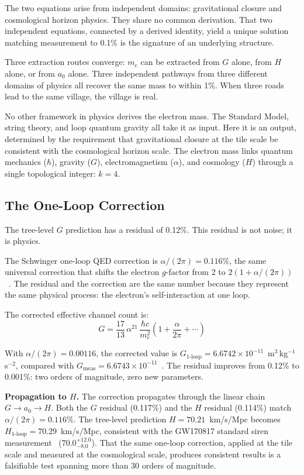 \documentclass[aps,prd,preprint,superscriptaddress,showpacs,preprintnumbers,amsmath,amssymb,nofootinbib]{revtex4-2}
\begin{document}
The two equations arise from independent domains: gravitational closure and cosmological horizon physics. They share no common derivation. That two independent equations, connected by a derived identity, yield a unique solution matching measurement to 0.1\% is the signature of an underlying structure.

Three extraction routes converge: $m_e$ can be extracted from $G$ alone, from $H$ alone, or from $a_0$ alone. Three independent pathways from three different domains of physics all recover the same mass to within 1\%. When three roads lead to the same village, the village is real.

No other framework in physics derives the electron mass. The Standard Model, string theory, and loop quantum gravity all take it as input. Here it is an output, determined by the requirement that gravitational closure at the tile scale be consistent with the cosmological horizon scale. The electron mass links quantum mechanics ($\hbar$), gravity ($G$), electromagnetism ($\alpha$), and cosmology ($H$) through a single topological integer: $k = 4$.

\subsection{The One-Loop Correction}
\label{subsec:one-loop}

The tree-level $G$ prediction has a residual of 0.12\%. This residual is not noise; it is physics.

The Schwinger one-loop QED correction is $\alpha/(2\pi) = 0.116\%$, the same universal correction that shifts the electron $g$-factor from 2 to $2(1 + \alpha/(2\pi))$~\cite{schwinger1948}. The residual and the correction are the same number because they represent the same physical process: the electron's self-interaction at one loop.

The corrected effective channel count is:
\begin{equation}
G = \frac{17}{13}\,\alpha^{21}\,\frac{\hbar c}{m_e^2}\left(1 + \frac{\alpha}{2\pi} + \cdots\right)
\label{eq:G-oneloop}
\end{equation}

With $\alpha/(2\pi) = 0.00116$, the corrected value is $G_{1\text{-loop}} = 6.6742 \times 10^{-11}$~m$^3$\,kg$^{-1}$\,s$^{-2}$, compared with $G_{\text{meas}} = 6.6743 \times 10^{-11}$~\cite{codata2022}. The residual improves from 0.12\% to 0.001\%: two orders of magnitude, zero new parameters.

\textbf{Propagation to $H$.} The correction propagates through the linear chain $G \to a_0 \to H$. Both the $G$ residual (0.117\%) and the $H$ residual (0.114\%) match $\alpha/(2\pi) = 0.116\%$. The tree-level prediction $H = 70.21$~km/s/Mpc becomes $H_{1\text{-loop}} = 70.29$~km/s/Mpc, consistent with the GW170817 standard siren measurement~\cite{gw170817} ($70.0^{+12.0}_{-8.0}$). That the same one-loop correction, applied at the tile scale and measured at the cosmological scale, produces consistent results is a falsifiable test spanning more than 30 orders of magnitude.
\end{document}
